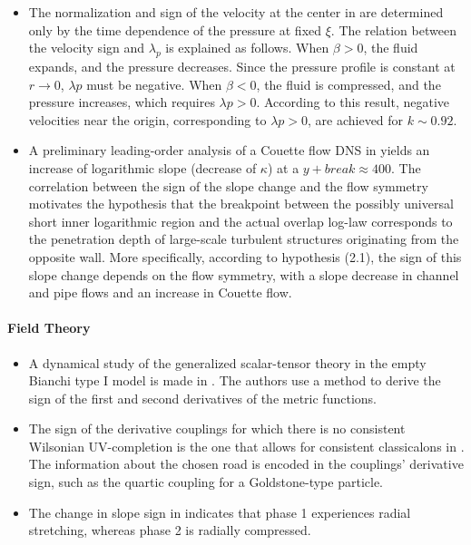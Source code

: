 \documentclass[11pt]{book}
\begin{document}
\begin{itemize}
\item The normalization and sign of the velocity at the center in \cite{faran2021non}
are determined only by the time dependence of the pressure at fixed
$\xi$. The relation between the velocity sign and $\lambda_{p}$
is explained as follows. When $\beta>0$, the fluid expands, and the
pressure decreases. Since the pressure profile is constant at $r\rightarrow0$,
$\lambda p$ must be negative. When $\beta<0$, the fluid is compressed,
and the pressure increases, which requires $\lambda p>0$. According
to this result, negative velocities near the origin, corresponding
to $\lambda p>0$, are achieved for $k\sim0.92$.
\item A preliminary leading-order analysis of a Couette flow DNS in \cite{monkewitz2021late}
yields an increase of logarithmic slope (decrease of $\kappa$) at
a $y+break\approx400$. The correlation between the sign of the slope
change and the flow symmetry motivates the hypothesis that the breakpoint
between the possibly universal short inner logarithmic region and
the actual overlap log-law corresponds to the penetration depth of
large-scale turbulent structures originating from the opposite wall.
More specifically, according to hypothesis (2.1), the sign of this
slope change depends on the flow symmetry, with a slope decrease in
channel and pipe flows and an increase in Couette flow.
\end{itemize}
\paragraph{Field Theory}
\begin{itemize}
\item A dynamical study of the generalized scalar-tensor theory in the empty
Bianchi type I model is made in \cite{fay2000dynamical}.
The authors use a method to derive the sign of the first and second
derivatives of the metric functions.
\item The sign of the derivative couplings for which there is no consistent
Wilsonian UV-completion is the one that allows for consistent classicalons
in \cite{dvali2012road}. The information about
the chosen road is encoded in the couplings' derivative sign, such
as the quartic coupling for a Goldstone-type particle.
\item The change in slope sign in \cite{kiefer2017numerical}
indicates that phase 1 experiences radial stretching, whereas phase
2 is radially compressed.
\end{itemize}
\end{document}
